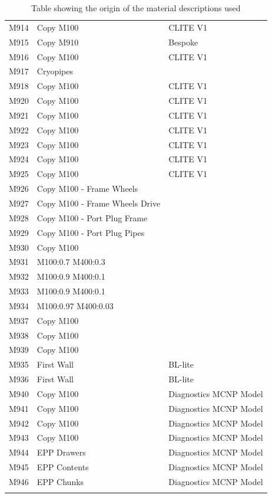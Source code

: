 \documentclass[12pt]{article}
\begin{document}
\begin{centering}
\begin{longtable}[ht!]{ p{} | p{} | p{} }
  M914 & Copy M100 & CLITE V1\\
  M915 & Copy M910 & Bespoke \\
  M916 & Copy M100 & CLITE V1\\
  M917 & Cryopipes & \cite{cryopump_communication}\\
  M918 & Copy M100 & CLITE V1 \\
  M920 & Copy M100 & CLITE V1 \\
  M921 & Copy M100 & CLITE V1 \\
  M922 & Copy M100 & CLITE V1 \\
  M923 & Copy M100 & CLITE V1 \\
  M924 & Copy M100 & CLITE V1 \\
  M925 & Copy M100 & CLITE V1 \\
  M926 & Copy M100 - Frame Wheels & \cite{bertalot_communication}\\
  M927 & Copy M100 - Frame Wheels Drive & \cite{bertalot_communication}\\
  M928 & Copy M100 - Port Plug Frame & \cite{bertalot_communication}\\
  M929 & Copy M100 - Port Plug Pipes & \cite{bertalot_communication}\\
  M930 & Copy M100 & \cite{cryopump_communication}\\
  M931 & M100:0.7 M400:0.3 & \cite{bertalot_communication}\\
  M932 & M100:0.9 M400:0.1 & \cite{bertalot_communication}\\
  M933 & M100:0.9 M400:0.1 & \cite{bertalot_communication}\\
  M934 & M100:0.97 M400:0.03 & \cite{bertalot_communication}\\
  M937 & Copy M100 & \cite{cryopump_communication}\\
  M938 & Copy M100 & \cite{cryopump_communication}\\
  M939 & Copy M100 & \cite{cryopump_communication}\\
  M935 & First Wall & BL-lite \\
  M936 & First Wall & BL-lite \\
  M940 & Copy M100 & Diagnostics MCNP Model \\
  M941 & Copy M100 & Diagnostics MCNP Model \\
  M942 & Copy M100 & Diagnostics MCNP Model \\
  M943 & Copy M100 & Diagnostics MCNP Model \\
  M944 & EPP Drawers & Diagnostics MCNP Model \\
  M945 & EPP Contents & Diagnostics MCNP Model \\
  M946 & EPP Chunks & Diagnostics MCNP Model \\
 \caption{Table showing the origin of the material descriptions used}
 \label{tab:material_origin}
 \end{longtable}
\end{centering}
\end{document}
